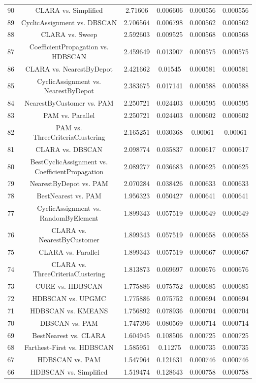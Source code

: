 \documentclass[a4paper,10pt]{article}
\begin{document}
\begin{landscape}
\begin{table}[!htp]
\begin{tabular}{cccccc}
90&CLARA vs. Simplified&2.71606&0.006606&0.000556&0.000556\\
89&CyclicAssignment vs. DBSCAN&2.706564&0.006798&0.000562&0.000562\\
88&CLARA vs. Sweep&2.592603&0.009525&0.000568&0.000568\\
87&CoefficientPropagation vs. HDBSCAN&2.459649&0.013907&0.000575&0.000575\\
86&CLARA vs. NearestByDepot&2.421662&0.01545&0.000581&0.000581\\
85&CyclicAssignment vs. NearestByDepot&2.383675&0.017141&0.000588&0.000588\\
84&NearestByCustomer vs. PAM&2.250721&0.024403&0.000595&0.000595\\
83&PAM vs. Parallel&2.250721&0.024403&0.000602&0.000602\\
82&PAM vs. ThreeCriteriaClustering&2.165251&0.030368&0.00061&0.00061\\
81&CLARA vs. DBSCAN&2.098774&0.035837&0.000617&0.000617\\
80&BestCyclicAssignment vs. CoefficientPropagation&2.089277&0.036683&0.000625&0.000625\\
79&NearestByDepot vs. PAM&2.070284&0.038426&0.000633&0.000633\\
78&BestNearest vs. PAM&1.956323&0.050427&0.000641&0.000641\\
77&CyclicAssignment vs. RandomByElement&1.899343&0.057519&0.000649&0.000649\\
76&CLARA vs. NearestByCustomer&1.899343&0.057519&0.000658&0.000658\\
75&CLARA vs. Parallel&1.899343&0.057519&0.000667&0.000667\\
74&CLARA vs. ThreeCriteriaClustering&1.813873&0.069697&0.000676&0.000676\\
73&CURE vs. HDBSCAN&1.775886&0.075752&0.000685&0.000685\\
72&HDBSCAN vs. UPGMC&1.775886&0.075752&0.000694&0.000694\\
71&HDBSCAN vs. KMEANS&1.756892&0.078936&0.000704&0.000704\\
70&DBSCAN vs. PAM&1.747396&0.080569&0.000714&0.000714\\
69&BestNearest vs. CLARA&1.604945&0.108506&0.000725&0.000725\\
68&Farthest-First vs. HDBSCAN&1.585951&0.11275&0.000735&0.000735\\
67&HDBSCAN vs. PAM&1.547964&0.121631&0.000746&0.000746\\
66&HDBSCAN vs. Simplified&1.519474&0.128643&0.000758&0.000758\\

\end{tabular}
\end{table}
\end{landscape}
\end{document}
